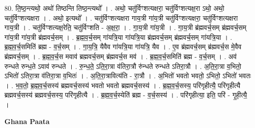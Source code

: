 \documentclass[17pt]{extarticle}
\begin{document}
80. ति॒ष्ठ॒न्त्यथो॒ अथो॑ तिष्ठन्ति तिष्ठ॒न्त्यथो᳚ । . अथो॒ चतु॑र्विꣳशत्यक्षरा॒ चतु॑र्विꣳशत्यक्ष॒रा ऽथो॒ अथो॒ चतु॑र्विꣳशत्यक्षरा । . अथो॒ इत्यथो᳚ । . चतु॑र्विꣳशत्यक्षरा गाय॒त्री गा॑य॒त्री चतु॑र्विꣳशत्यक्षरा॒ चतु॑र्विꣳशत्यक्षरा गाय॒त्री । . चतु॑र्विꣳशत्यक्ष॒रेति॒ चतु॑र्विꣳशति - अ॒क्ष॒रा॒ । . गा॒य॒त्री गा॑य॒त्री । . गा॒य॒त्री ब्र॑ह्मवर्च॒सम् ब्र॑ह्मवर्च॒सम् गा॑य॒त्री गा॑य॒त्री ब्र॑ह्मवर्च॒सम् । . ब्र॒ह्म॒व॒र्च॒सम् गा॑यत्रि॒या गा॑यत्रि॒या ब्र॑ह्मवर्च॒सम् ब्र॑ह्मवर्च॒सम् गा॑यत्रि॒या । . ब्र॒ह्म॒व॒र्च॒समिति॑ ब्रह्म - व॒र्च॒सम् । . गा॒य॒त्रि॒ यैवैव गा॑यत्रि॒या गा॑यत्रि॒ यैव । . ए॒व ब्र॑ह्मवर्च॒सम् ब्र॑ह्मवर्च॒स मे॒वैव ब्र॑ह्मवर्च॒सम् । . ब्र॒ह्म॒व॒र्च॒स मवाव॑ ब्रह्मवर्च॒सम् ब्र॑ह्मवर्च॒स मव॑ । . ब्र॒ह्म॒व॒र्च॒समिति॑ ब्रह्म - व॒र्च॒सम् । . अव॑ रुन्धते रुन्ध॒ते ऽवाव॑ रुन्धते । . रु॒न्ध॒ते॒ ऽति॒रा॒त्रा व॑तिरा॒त्रौ रु॑न्धते रुन्धते ऽतिरा॒त्रौ । . अ॒ति॒रा॒त्रा व॒भितो॒ ऽभितो॑ ऽतिरा॒त्रा व॑तिरा॒त्रा व॒भितः॑ । . अ॒ति॒रा॒त्रावित्य॑ति - रा॒त्रौ । . अ॒भितो॑ भवतो भवतो॒ ऽभितो॒ ऽभितो॑ भवतः । . भ॒व॒तो॒ ब्र॒ह्म॒व॒र्च॒सस्य॑ ब्रह्मवर्च॒सस्य॑ भवतो भवतो ब्रह्मवर्च॒सस्य॑ । . ब्र॒ह्म॒व॒र्च॒सस्य॒ परि॑गृहीत्यै॒ परि॑गृहीत्यै ब्रह्मवर्च॒सस्य॑ ब्रह्मवर्च॒सस्य॒ परि॑गृहीत्यै । . ब्र॒ह्म॒व॒र्च॒स्येति॑ ब्रह्म - व॒र्च॒सस्य॑ । . परि॑गृहीत्या॒ इति॒ परि॑ - गृ॒ही॒त्यै॒ । \newline

\textbf{Ghana Paata } \newline
\end{document}
